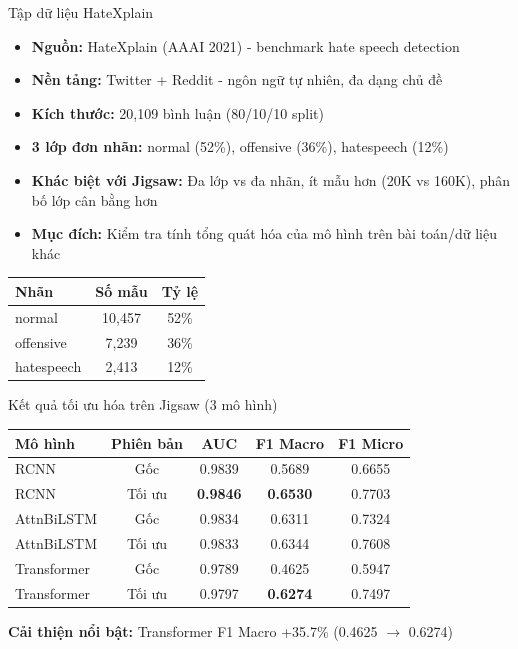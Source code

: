 \documentclass[serif, aspectratio=169]{beamer}
\begin{document}
\begin{frame}{Tập dữ liệu HateXplain}
\begin{itemize}
    \item \textbf{Nguồn:} HateXplain (AAAI 2021) - benchmark hate speech detection
    \item \textbf{Nền tảng:} Twitter + Reddit - ngôn ngữ tự nhiên, đa dạng chủ đề
    \item \textbf{Kích thước:} 20,109 bình luận (80/10/10 split)
    \item \textbf{3 lớp đơn nhãn:} normal (52\%), offensive (36\%), hatespeech (12\%)
    \item \textbf{Khác biệt với Jigsaw:} Đa lớp vs đa nhãn, ít mẫu hơn (20K vs 160K), phân bố lớp cân bằng hơn
    \item \textbf{Mục đích:} Kiểm tra tính tổng quát hóa của mô hình trên bài toán/dữ liệu khác
\end{itemize}
\vspace{0.2cm}
\begin{table}
\centering
\small
\begin{tabular}{lcc}
\toprule
Nhãn & Số mẫu & Tỷ lệ \\
\midrule
normal & 10,457 & 52\% \\
offensive & 7,239 & 36\% \\
hatespeech & 2,413 & 12\% \\
\bottomrule
\end{tabular}
\end{table}
\end{frame}

\begin{frame}{Kết quả tối ưu hóa trên Jigsaw (3 mô hình)}
\begin{table}
\centering
\small
\begin{tabular}{lcccc}
\toprule
\textbf{Mô hình} & \textbf{Phiên bản} & \textbf{AUC} & \textbf{F1 Macro} & \textbf{F1 Micro} \\
\midrule
RCNN & Gốc & 0.9839 & 0.5689 & 0.6655 \\
RCNN & Tối ưu & \textbf{0.9846} & \textbf{0.6530} & 0.7703 \\
\midrule
AttnBiLSTM & Gốc & 0.9834 & 0.6311 & 0.7324 \\
AttnBiLSTM & Tối ưu & 0.9833 & 0.6344 & 0.7608 \\
\midrule
Transformer & Gốc & 0.9789 & 0.4625 & 0.5947 \\
Transformer & Tối ưu & 0.9797 & \textbf{0.6274} & 0.7497 \\
\bottomrule
\end{tabular}
\end{table}
\vspace{0.2cm}
\textbf{Cải thiện nổi bật:} Transformer F1 Macro +35.7\% (0.4625 $\rightarrow$ 0.6274)
\end{frame}
\end{document}
